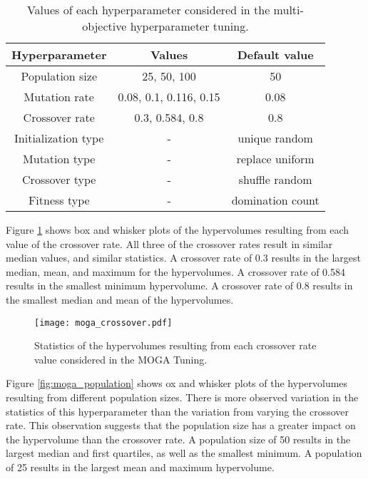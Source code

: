 \begin{table}[h!]
    \centering 
    \caption{Values of each hyperparameter considered in the 
    multi-objective hyperparameter tuning.}
    \label{tab:moga_tuning}
    \begin{tabular}{c c c} 
        \hline
        Hyperparameter & Values & Default value\\
        \hline
        Population size & 25, 50, 100 & 50\\
        Mutation rate & 0.08, 0.1, 0.116, 0.15 & 0.08 \\
        Crossover rate & 0.3, 0.584, 0.8 & 0.8 \\
        \hline
        Initialization type & - & unique random \\
        Mutation type & - & replace uniform \\
        Crossover type & - & shuffle random \\
        Fitness type & - & domination count \\
        \hline
        
    \end{tabular}
\end{table}

Figure \ref{fig:moga_crossover} shows box and whisker plots of 
the hypervolumes 
resulting from each value of the crossover rate. All three of the 
crossover rates result in similar median values, and similar statistics. 
A crossover rate of 
0.3 results in the largest median, mean, and maximum for the 
hypervolumes. A crossover rate of 0.584 results in the smallest minimum 
hypervolume. A crossover rate of 0.8 results in the smallest median 
and mean of the hypervolumes. 

\begin{figure}[h!]
    \centering 
    \texttt{[image: moga\_crossover.pdf]}
    \caption{Statistics of the hypervolumes resulting from each 
    crossover rate value considered in the MOGA Tuning.}
    \label{fig:moga_crossover}
\end{figure}

Figure \ref{fig:moga_population} shows ox and whisker plots of 
the hypervolumes 
resulting from different population sizes. There is more observed variation 
in the statistics of this hyperparameter than the variation from varying 
the crossover rate. This observation suggests that the population size has 
a greater impact on the hypervolume than the crossover rate. A population 
size of 50 results in the largest median and first quartiles, as well 
as the smallest minimum. A population of 25 results in the largest mean 
and maximum hypervolume. 

